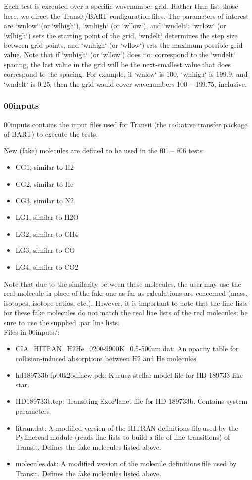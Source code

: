\documentclass[letterpaper, 12pt]{article}
\begin{document}
Each test is executed over a specific wavenumber grid.  Rather than list those here, we direct the Transit/BART configuration files.  The parameters of interest are `wnlow` (or `wlhigh`), `wnhigh` (or `wllow`), and `wndelt`; `wnlow` (or `wlhigh`) sets the starting point of the grid, `wndelt` determines the step size between grid points, and `wnhigh` (or `wllow`) sets the maximum possible grid value.  Note that if `wnhigh` (or `wllow`) does not correspond to the `wndelt` spacing, the last value in the grid will be the next-smallest value that does correspond to the spacing.  For example, if `wnlow` is 100, `wnhigh` is 199.9, and `wndelt` is 0.25, then the grid would cover wavenumbers 100 -- 199.75, inclusive.

\subsubsection{00inputs}
\label{sec:inputs}
00inputs contains the input files used for Transit (the radiative transfer package of BART) to execute the tests.

New (fake) molecules are defined to be used in the f01 -- f06 tests:
\begin{itemize} \itemsep0pt
  \item CG1, similar to H2
  \item CG2, similar to He
  \item CG3, similar to N2
  \item LG1, similar to H2O
  \item LG2, similar to CH4
  \item LG3, similar to CO
  \item LG4, similar to CO2
\end{itemize}
Note that due to the similarity between these molecules, the user may use 
the real molecule in place of the fake one as far as calculations are 
concerned (mass, isotopes, isotope ratios, etc.). However, it is important to 
note that the line lists for these fake molecules do not match the real line 
lists of the real molecules; be sure to use the supplied .par line lists.\\

Files in 00inputs/:
\begin{itemize} \itemsep0pt
  \item CIA{\_}HITRAN{\_}H2He{\_}0200-9900K{\_}0.5-500um.dat: An opacity table 
        for collision-induced absorptions between H2 and He molecules.
  \item hd189733b-fp00k2odfnew.pck: Kurucz stellar model file for HD 189733-like star.
  \item HD189733b.tep: Transiting ExoPlanet file for HD 189733b. Contains 
        system parameters.
  \item litran.dat: A modified version of the HITRAN definitions file used by 
        the Pylineread module (reads line lists to build a file of line 
        transitions) of Transit. Defines the fake molecules listed above.
  \item molecules.dat: A modified version of the molecule definitions file 
        used by Transit. Defines the fake molecules listed above.
\end{itemize}
\end{document}
